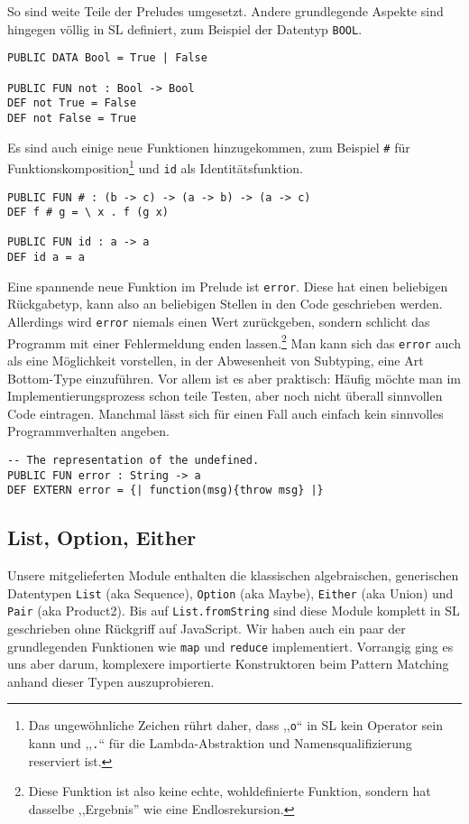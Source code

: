 \documentclass[runningheads]{llncs}
\begin{document}
So sind weite Teile der Preludes umgesetzt. Andere grundlegende Aspekte
sind hingegen völlig in SL definiert, zum Beispiel der Datentyp \verb|BOOL|.

\begin{verbatim}
PUBLIC DATA Bool = True | False

PUBLIC FUN not : Bool -> Bool
DEF not True = False
DEF not False = True
\end{verbatim}

Es sind auch einige neue Funktionen hinzugekommen, zum Beispiel \verb|#|
für Funktionskomposition\footnote{Das ungewöhnliche Zeichen rührt daher,
dass ,,\texttt{o}`` in SL kein Operator sein kann und ,,\texttt{.}`` für die
Lambda-Abstraktion und Namensqualifizierung reserviert ist.} und
\verb|id| als Identitätsfunktion.

\begin{verbatim}
PUBLIC FUN # : (b -> c) -> (a -> b) -> (a -> c)
DEF f # g = \ x . f (g x)

PUBLIC FUN id : a -> a
DEF id a = a
\end{verbatim}

Eine spannende neue Funktion im Prelude ist \verb|error|. Diese hat einen
beliebigen Rückgabetyp, kann also an beliebigen Stellen in den Code
geschrieben werden. Allerdings wird \verb|error| niemals einen Wert
zurückgeben, sondern schlicht das Programm mit einer Fehlermeldung enden
lassen.\footnote{Diese Funktion ist also keine echte, wohldefinierte Funktion,
sondern hat dasselbe ,,Ergebnis'' wie eine Endlosrekursion.} Man kann sich
das \verb|error| auch als eine Möglichkeit vorstellen, in der Abwesenheit von
Subtyping, eine Art Bottom-Type einzuführen. Vor allem ist es aber praktisch:
Häufig möchte man im Implementierungsprozess schon teile Testen, aber noch
nicht überall sinnvollen Code eintragen. Manchmal lässt sich für einen
Fall auch einfach kein sinnvolles Programmverhalten angeben.

\begin{verbatim}
-- The representation of the undefined.
PUBLIC FUN error : String -> a
DEF EXTERN error = {| function(msg){throw msg} |} 
\end{verbatim}

\subsection{List, Option, Either}

Unsere mitgelieferten Module enthalten die klassischen algebraischen,
generischen Datentypen \verb|List| (aka Sequence), \verb|Option| (aka Maybe),
\verb|Either| (aka Union) und \verb|Pair| (aka Product2).
Bis auf \verb|List.fromString| sind diese Module komplett in SL geschrieben
ohne Rückgriff auf JavaScript. Wir haben auch ein paar der grundlegenden
Funktionen wie \verb|map| und \verb|reduce| implementiert. Vorrangig ging
es uns aber darum, komplexere importierte Konstruktoren beim Pattern Matching
anhand dieser Typen auszuprobieren.
\end{document}
